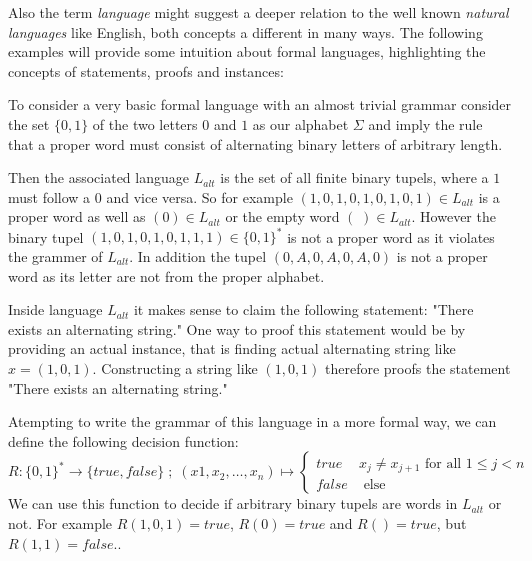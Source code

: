 Also the term \textit{language} might suggest a deeper relation to the well known \textit{natural languages} like English, both concepts a different in many ways. The following examples will provide some intuition about formal languages, highlighting the concepts of statements, proofs and instances:
\begin{example} To consider a very basic formal language with an almost trivial grammar consider the set $\{0,1\}$ of the two letters $0$ and $1$ as our alphabet $\Sigma$ and imply the rule that a proper word must consist of alternating binary letters of arbitrary length. 

Then the associated language $L_{alt}$ is the set of all finite binary tupels, where a $1$ must follow a $0$ and vice versa. So for example $(1,0,1,0,1,0,1,0,1)\in L_{alt}$ is a proper word as well as $(0)\in L_{alt}$ or the empty word $(\;)\in L_{alt}$. However the binary tupel $(1,0,1,0,1,0,1,1,1)\in \{0,1\}^*$ is not a proper word as it violates the grammer of $L_{alt}$. In addition the tupel $(0,A,0,A,0,A,0)$ is not a proper word as its letter are not from the proper alphabet. 

Inside language $L_{alt}$ it makes sense to claim the following statement: "There exists an alternating string." One way to proof this statement would be by providing an actual instance, that is finding actual alternating string like 
$x = (1,0,1)$. Constructing a string like $(1,0,1)$ therefore proofs the statement "There exists an alternating string."

Atempting to write the grammar of this language in a more formal way, we can define the following decision function:
$$
R: \{0,1\}^* \to \{true,false\}\;;\; (x1,x_2,\ldots,x_n) \mapsto 
\begin{cases}
true & x_j \neq x_{j+1} \text{ for all } 1\leq j < n \\
false & \text{ else}
\end{cases}
$$
We can use this function to decide if arbitrary binary tupels are words in $L_{alt}$ or not. For example $R(1,0,1)=true$, $R(0)=true$ and $R()=true$, but $R(1,1)=false $.. 
\end{example}
